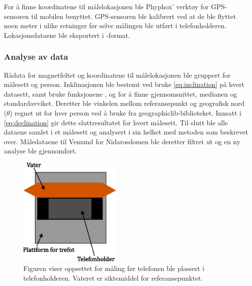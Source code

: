 For å finne koordinatene til målelokasjonen ble Phyphox' verktøy for GPS-sensoren til mobilen benyttet. GPS-sensoren ble kalibrert ved at de ble flyttet noen meter i ulike retninger før selve målingen ble utført i telefonholderen. Lokasjonsdataene ble eksportert i -format.

\subsubsection{Analyse av data}
Rådata for magnetfeltet og koordinatene til målelokasjonen ble gruppert for målesett og person.
Inklinasjonen ble bestemt ved bruke \eqref{eq:inclination} på hvert datasett, samt bruke funksjonene ,  og  for å finne gjennomsnittet, medianen og standardavviket.
Deretter ble vinkelen mellom referansepunkt og geografisk nord ($\theta$) regnet ut for hver person ved å bruke  fra geographiclib-biblioteket.
Innsatt i \eqref{eq:declination} gir dette sluttresultatet for hvert målesett.
Til slutt ble alle dataene samlet i et målesett og analysert i sin helhet med metoden som beskrevet over. Måledataene til Vemund for Nidarosdomen ble deretter filtret ut og en ny analyse ble gjennomført.   

 
\begin{figure}
    \centering
    \includegraphics[width=0.45\textwidth]{img/Plattform med vater.pdf}                 
    \caption{Figuren viser oppsettet for måling før telefonen ble plassert i telefonholderen. Vateret er siktemiddel for referansepunktet.}
    \label{fig:med_vater}
\end{figure}

